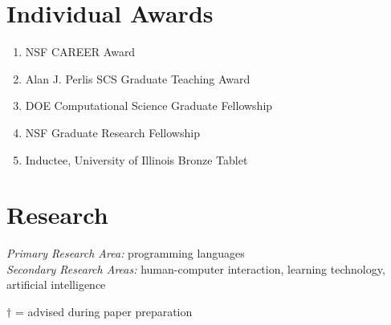 \documentclass[10pt,letterpaper]{article}
\begin{document}
\section*{Individual Awards}
\begin{enumerate}
  \item NSF CAREER Award
  \item {Alan J. Perlis SCS Graduate Teaching Award}
  \item DOE Computational Science Graduate Fellowship
  \item NSF Graduate Research Fellowship
  \item Inductee, University of Illinois Bronze Tablet
\end{enumerate}

\section*{Research}

\textit{Primary Research Area:} programming languages \\
\textit{Secondary Research Areas:} human-computer interaction, learning technology, artificial intelligence

\newcommand{\advisee}[1]{#1$^\dagger$}
$\dagger$ = advised during paper preparation
\end{document}

